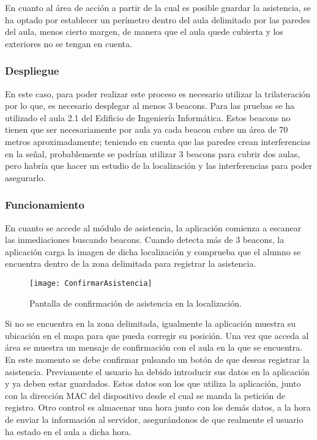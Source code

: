 En cuanto al área de acción a partir de la cual es posible guardar la asistencia, se ha optado por establecer un perímetro dentro del aula delimitado por las paredes del aula, menos cierto margen, de manera que el aula quede cubierta y los exteriores no se tengan en cuenta. 

\subsubsection{Despliegue}

En este caso, para poder realizar este proceso es necesario utilizar la trilateración \cite{URL::trilateracion} por lo que, es necesario desplegar al menos 3 beacons. Para las pruebas se ha utilizado el aula 2.1 del Edificio de Ingeniería Informática. Estos beacons no tienen que ser necesariamente por aula ya cada beacon cubre un área de 70 metros aproximadamente; teniendo en cuenta que las paredes crean interferencias en la señal, probablemente se podrían utilizar 3 beacons para cubrir dos aulas, pero habría que hacer un estudio de la localización y las interferencias para poder asegurarlo. 

\subsubsection{Funcionamiento}


En cuanto se accede al módulo de asistencia, la aplicación comienza a escanear las inmediaciones buscando beacons. Cuando detecta más de 3 beacons, la aplicación carga la imagen de dicha localización y comprueba que el alumno se encuentra dentro de la zona delimitada para registrar la asistencia.

\begin{figure}[H]
	\centering
	\texttt{[image: ConfirmarAsistencia]}
	\caption{Pantalla de confirmación de asistencia en la localización.}
	\label{fig:confirmarAsistencia}
\end{figure}

Si no se encuentra en la zona delimitada, igualmente la aplicación muestra su ubicación en el mapa para que pueda corregir su posición. Una vez que acceda al área se muestra un mensaje de confirmación con el aula en la que se encuentra. En este momento se debe confirmar pulsando un botón de que deseas registrar la asistencia. Previamente el usuario ha debido introducir sus datos en la aplicación y ya deben estar guardados. Estos datos son los que utiliza la aplicación, junto con la dirección MAC del dispositivo desde el cual se manda la petición de registro. Otro control es almacenar una hora junto con los demás datos, a la hora de enviar la información al servidor, asegurándonos de que realmente el usuario ha estado en el aula a dicha hora.


